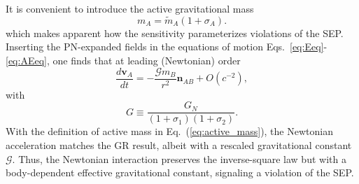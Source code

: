 \documentclass[
    floats,
    floatfix,
    amssymb,
    prd,
    twocolumn,
    superscriptaddress,
    nofootinbib,
    unicode,
    colorlinks=true,
    linktocpage=true
]{revtex4-2}
\begin{document}
It is convenient to introduce the active gravitational mass
\begin{equation}\label{eq:active_mass}
m_A=\tilde m_A(1+\sigma_A).
\end{equation}
which makes apparent how the sensitivity parameterizes violations of the SEP.
Inserting the PN-expanded fields in the equations of motion Eqs.~\eqref{eq:Eeq}-\eqref{eq:AEeq}, one finds that at leading (Newtonian) order
\begin{equation}\label{eq:newtonian}
\frac{d\mathbf v_A}{dt}
=
-\frac{\mathcal{G} m_B}{r^2}\mathbf n_{AB}
+O(c^{-2}),
\end{equation}
with
\begin{equation}\label{eq:G}
G \equiv \frac{G_N}{(1+\sigma_1)(1+\sigma_2)}.
\end{equation}
%
With the definition of active mass in Eq.~(\ref{eq:active_mass}), the Newtonian acceleration matches the GR result, albeit with a rescaled gravitational constant $\mathcal{G}$. Thus, the Newtonian interaction preserves the inverse-square law but with a body-dependent effective gravitational constant, signaling a violation of the SEP. 
\end{document}
